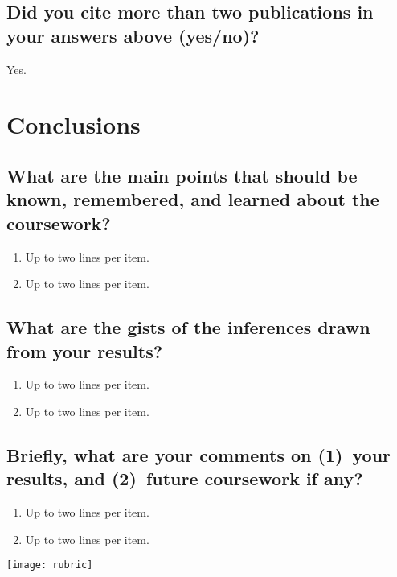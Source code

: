 \subsection{Did you cite more than two publications in your answers above (yes/no)?}
Yes.	



















\section{Conclusions}
\label{sec:conc}

\subsection{What are the main points that should be known, remembered, and learned about the coursework?}
\begin{enumerate}
	\item Up to two lines per item.
	\item Up to two lines per item.
\end{enumerate}

\subsection{What are the gists of the inferences drawn from your results?}
\begin{enumerate}
	\item Up to two lines per item.
	\item Up to two lines per item.
\end{enumerate}

\subsection{Briefly, what are your comments on (1)~your results, and  (2)~future coursework if any?}
\begin{enumerate}
	\item Up to two lines per item.
	\item Up to two lines per item.
\end{enumerate}	






\newpage
\begin{figure*}[!t]
	\texttt{[image: rubric]} 
\end{figure*}
\cleardoublepage

